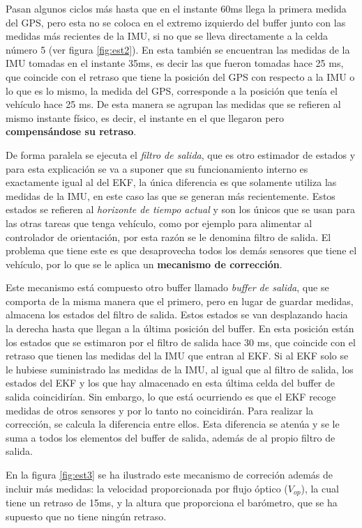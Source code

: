Pasan algunos ciclos más hasta que en el instante 60ms llega la primera medida del GPS, pero esta no se coloca en el extremo izquierdo del buffer junto con las medidas más recientes de la IMU, si no que se lleva directamente a la celda número 5 (ver figura \ref{fig:est2}). En esta también se encuentran las medidas de la IMU tomadas en el instante 35ms, es decir las que fueron tomadas hace 25 ms, que coincide con el retraso que tiene la posición del GPS con respecto a la IMU o lo que es lo mismo, la medida del GPS, corresponde a la posición que tenía el vehículo hace 25 ms. De esta manera se agrupan las medidas que se refieren al mismo instante físico, es decir, el instante en el que llegaron pero {\bfseries compensándose su retraso}. 


De forma paralela se ejecuta el \textit{filtro de salida}, que es otro estimador de estados y para esta explicación se va a suponer que su funcionamiento interno es exactamente igual al del EKF, la única diferencia es que solamente utiliza las medidas de la IMU, en este caso las que se generan más recientemente. Estos estados se refieren al \textit{horizonte de tiempo actual} y son los únicos que se usan para las otras tareas que tenga vehículo, como por ejemplo para alimentar al controlador de orientación, por esta razón se le denomina filtro de salida. El problema que tiene este es que desaprovecha todos los demás sensores que tiene el vehículo, por lo que se le aplica un \textbf{mecanismo de corrección}.  

Este mecanismo está compuesto otro buffer llamado \textit{buffer de salida}, que se comporta de la misma manera que el primero, pero en lugar de guardar medidas, almacena los estados del filtro de salida. Estos estados se van desplazando hacia la derecha hasta que llegan a la última posición del buffer. En esta posición están los estados que se estimaron por el filtro de salida hace 30 ms, que coincide con el retraso que tienen las medidas del la IMU que entran al EKF. Si al EKF solo se le hubiese suministrado las medidas de la IMU, al igual que al filtro de salida, los estados del EKF y los que hay almacenado en esta última celda del buffer de salida coincidirían. Sin embargo, lo que está ocurriendo es que el EKF recoge medidas de otros sensores y por lo tanto no coincidirán. Para realizar la corrección, se calcula la diferencia entre ellos. Esta diferencia se atenúa y se le suma a todos los elementos del buffer de salida, además de al propio filtro de salida. 

En la figura \ref{fig:est3} se ha ilustrado este mecanismo de correción además de incluir más medidas: la velocidad proporcionada por flujo óptico ($V_{op}$), la cual tiene un retraso de 15ms, y la altura que proporciona el barómetro, que se ha supuesto que no tiene ningún retraso. 

